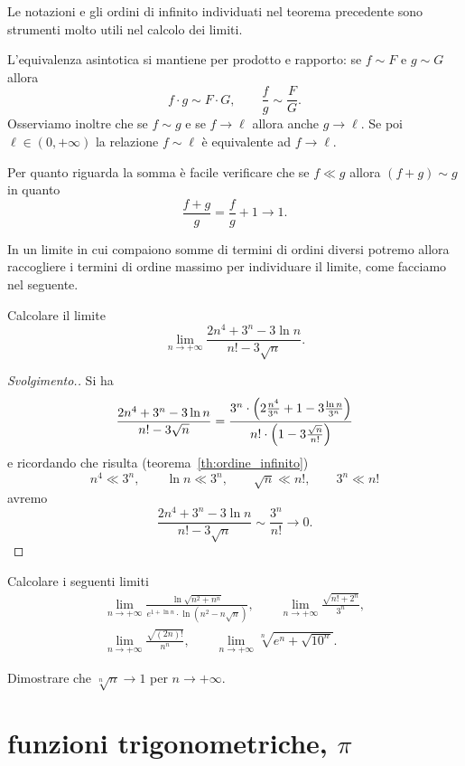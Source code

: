 Le notazioni e gli
ordini di infinito individuati nel teorema precedente
sono strumenti molto utili nel calcolo dei limiti.

L'equivalenza asintotica
si mantiene per prodotto e rapporto:
se $f\sim F$ e $g\sim G$ allora
\[
 f \cdot g \sim F \cdot G,
 \qquad
 \frac{f}{g} \sim \frac{F}{G}.
\]
Osserviamo inoltre che se
$f \sim g$ e se $f\to \ell$ allora
anche $g\to \ell$.
Se poi $\ell\in(0,+\infty)$
la relazione $f\sim \ell$ è equivalente ad $f\to \ell$.

Per quanto riguarda la somma
è facile verificare che se $f\ll g$ allora
$(f+g) \sim g$ in quanto
\[
  \frac{f + g}{g} = \frac{f}{g} + 1 \to 1.
\]

In un limite in cui compaiono somme di termini
di ordini diversi potremo allora raccogliere i termini di ordine
massimo per individuare il limite, come facciamo
nel seguente.

\begin{example}
Calcolare il limite
\[
\lim_{n\to+\infty}
\frac{2n^4 + 3^n - 3 \ln n}{n! - 3\sqrt n}.
\]
\end{example}
\begin{proof}[Svolgimento.]
Si ha
\[
\frac{2n^4 + 3^n - 3 \ln n}{n! - 3\sqrt{n}}
= \frac
{3^n \cdot {\left( 2\frac{n^4}{3^n}+ 1 - 3\frac{\ln n}{3^n} \right)}}
{n!\cdot {\left( 1-3\frac{\sqrt n}{n!} \right)}}
\]
e ricordando che risulta (teorema~\ref{th:ordine_infinito})
\[
n^4 \ll 3^n, \qquad
\ln n \ll 3^n, \qquad
\sqrt n \ll n!, \qquad
3^n \ll n!
\]
avremo
\[
\frac{2n^4 + 3^n - 3 \ln n}{n! - 3\sqrt{n}}
\sim \frac{3^n}{n!} \to 0.
\]
\end{proof}


\begin{exercise}
Calcolare i seguenti limiti
\begin{gather*}
  \lim_{n\to +\infty} \frac{\displaystyle \ln\sqrt{n^2+n^n}}
  {\displaystyle e^{1 + \ln n}\cdot \ln(n^2-n\sqrt n)}, \qquad
  \lim_{n\to +\infty} \frac{\sqrt{n! + 2^n}}{3^n}, \\
  \lim_{n\to +\infty} \frac{\sqrt{(2n)!}}{n^n}, \qquad
  \lim_{n\to +\infty} \sqrt[n]{e^n + \sqrt{10^n}}.
\end{gather*}
\end{exercise}

\begin{exercise}
  Dimostrare che $\sqrt[n]{n}\to 1$ per $n\to +\infty$.
\end{exercise}



\section{funzioni trigonometriche, $\pi$}

